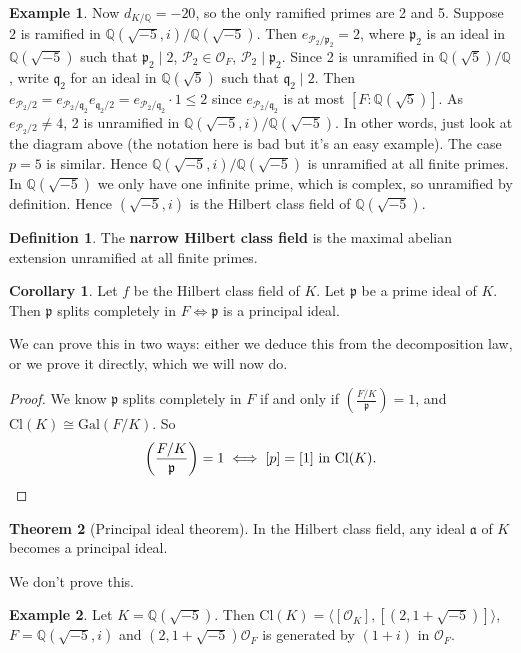 \documentclass{article}
\theoremstyle{definition}
\newtheorem{theorem}{Theorem}[section]
\newtheorem{cor}[theorem]{Corollary}
\newtheorem{example}{Example}[section]
\newtheorem{defn}{Definition}[section]
\begin{document}
\begin{example}
    Now $d_{K/\mathbb{Q}} = -20$, so the only ramified primes are 2 and 5. Suppose $2$ is ramified in $\mathbb{Q}(\sqrt{-5},i)/\mathbb{Q}(\sqrt{-5})$. Then $e_{\mathcal{P}_2/\mathfrak{p}_2}=2$, where $\mathfrak{p}_2$ is an ideal in $\mathbb{Q}(\sqrt{-5})$ such that $\mathfrak{p}_2 \mid 2$, $\mathcal{P}_2 \in \mathcal{O}_F$, $\mathcal{P}_2 \mid \mathfrak{p}_2$. Since 2 is unramified in $\mathbb{Q}(\sqrt{5})/\mathbb{Q}$, write $\mathfrak{q}_2$ for an ideal in $\mathbb{Q}(\sqrt{5})$ such that $\mathfrak{q}_2 \mid 2$. Then $e_{\mathcal{P}_2/2} = e_{\mathcal{P}_2/\mathfrak{q}_2}e_{\mathfrak{q_2}/2} = e_{\mathcal{P}_2/\mathfrak{q}_2}\cdot 1\le 2$ since $e_{\mathcal{P}_2/\mathfrak{q}_2}$ is at most $[F:\mathbb{Q}(\sqrt{5})]$. As $e_{\mathcal{P}_2/2} \neq 4$, 2 is unramified in $\mathbb{Q}(\sqrt{-5},i)/\mathbb{Q}(\sqrt{-5})$. In other words, just look at the diagram above (the notation here is bad but it's an easy example). The case $p=5$ is similar. Hence $\mathbb{Q}(\sqrt{-5},i)/\mathbb{Q}(\sqrt{-5})$ is unramified at all finite primes. In $\mathbb{Q}(\sqrt{-5})$ we only have one infinite prime, which is complex, so unramified by definition. Hence $(\sqrt{-5},i)$ is the Hilbert class field of $\mathbb{Q}(\sqrt{-5})$.
\end{example}
\begin{defn}
    The \textbf{narrow Hilbert class field} is the maximal abelian extension unramified at all finite primes.
\end{defn}
\begin{cor}
    Let $f$ be the Hilbert class field of $K$. Let $\mathfrak{p}$ be a prime ideal of $K$. Then $\mathfrak{p}$ splits completely in $F \iff \mathfrak{p}$ is a principal ideal.
\end{cor}
We can prove this in two ways: either we deduce this from the decomposition law, or we prove it directly, which we will now do.
\begin{proof}
    We know $\mathfrak{p}$ splits completely in $F$ if and only if $\left(\frac{F/K}{\mathfrak{p}}\right)=1$, and $\text{Cl}(K) \cong \text{Gal}(F/K)$. So \[
    \left(\frac{F/K}{\mathfrak{p}}\right) = 1 \iff [p]=[1] \text{ in }\text{Cl}(K).
    \qedhere\] 
\end{proof}
\begin{theorem}[Principal ideal theorem]
    In the Hilbert class field, any ideal $\mathfrak{a}$ of $K$ becomes a principal ideal.
\end{theorem}
We don't prove this.
\begin{example}
    Let $K = \mathbb{Q}(\sqrt{-5})$. Then $\text{Cl}(K) = \langle[\mathcal{O}_K], [(2,1+\sqrt{-5})]\rangle$, $F = \mathbb{Q}(\sqrt{-5},i)$ and $(2,1+\sqrt{-5})\mathcal{O}_F$ is generated by $(1+i)$ in $\mathcal{O}_F$.
\end{example}
\end{document}
